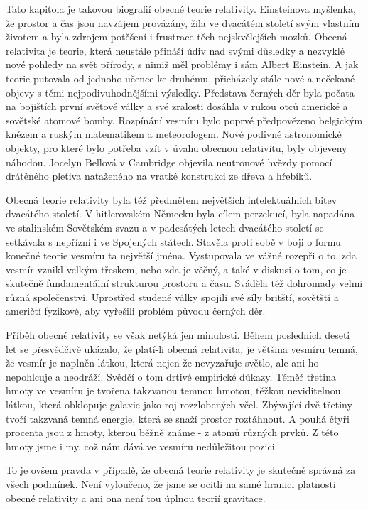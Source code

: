   Tato kapitola je takovou biografií obecné teorie relativity. Einsteinova myšlenka, že prostor a
  čas jsou navzájem provázány, žila ve dvacátém století svým vlastním životem a byla zdrojem
  potěšení i frustrace těch nejskvělejších mozků. Obecná relativita je teorie, která neustále
  přináší údiv nad svými důsledky a nezvyklé nové pohledy na svět přírody, s nimiž měl problémy i
  sám Albert Einstein. A jak teorie putovala od jednoho učence ke druhému, přicházely stále nové a
  nečekané objevy s těmi nejpodivuhodnějšími výsledky. Představa černých děr byla počata na
  bojištích první světové války a své zralosti dosáhla v rukou otců americké a sovětské atomové
  bomby. Rozpínání vesmíru bylo poprvé předpovězeno belgickým knězem a ruským matematikem a
  meteorologem. Nové podivné astronomické objekty, pro které bylo potřeba vzít v úvahu obecnou
  relativitu, byly objeveny náhodou. Jocelyn Bellová v Cambridge objevila neutronové hvězdy pomocí
  drátěného pletiva nataženého na vratké konstrukci ze dřeva a hřebíků. 

  Obecná teorie relativity byla též předmětem největších intelektuálních bitev dvacátého století. V
  hitlerovském Německu byla cílem perzekucí, byla napadána ve stalinském Sovětském svazu a v
  padesátých letech dvacátého století se setkávala s nepřízní i ve Spojených státech. Stavěla proti
  sobě v boji o formu konečné teorie vesmíru ta největší jména. Vystupovala ve vážné rozepři o to,
  zda vesmír vznikl velkým třeskem, nebo zda je věčný, a také v diskusi o tom, co je skutečně
  fundamentální strukturou prostoru a času. Sváděla též dohromady velmi různá společenství.
  Uprostřed studené války spojili své síly britští, sovětští a američtí fyzikové, aby vyřešili
  problém původu černých děr. 

  Příběh obecné relativity se však netýká jen minulosti. Během posledních deseti let se přesvědčivě
  ukázalo, že platí-li obecná relativita, je většina vesmíru temná, že vesmír je naplněn látkou,
  která nejen že nevyzařuje světlo, ale ani ho nepohlcuje a neodráží. Svědčí o tom drtivé empirické
  důkazy. Téměř třetina hmoty ve vesmíru je tvořena takzvanou temnou hmotou, těžkou neviditelnou
  látkou, která obklopuje galaxie jako roj rozzlobených včel. Zbývající dvě třetiny tvoří takzvaná
  temná energie, která se snaží prostor roztáhnout. A pouhá čtyři procenta jsou z hmoty, kterou
  běžně známe - z atomů různých prvků. Z této hmoty jsme i my, což nám dává ve vesmíru nedůležitou
  pozici. 

  To je ovšem pravda v případě, že obecná teorie relativity je skutečně správná za všech podmínek.
  Není vyloučeno, že jsme se ocitli na samé hranici platnosti obecné relativity a ani ona není tou
  úplnou teorií gravitace. 

